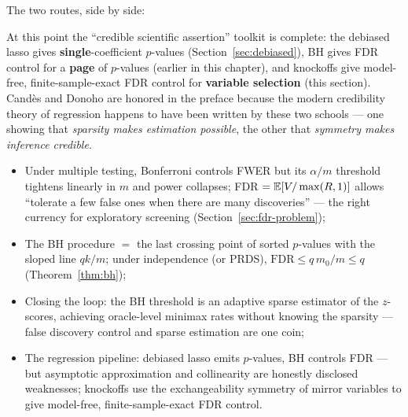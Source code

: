 The two routes, side by side:
\begin{center}
\end{center}

At this point the ``credible scientific assertion'' toolkit is complete: the debiased lasso gives \textbf{single}-coefficient $p$-values (Section~\ref{sec:debiased}), BH gives FDR control for a \textbf{page} of $p$-values (earlier in this chapter), and knockoffs give model-free, finite-sample-exact FDR control for \textbf{variable selection} (this section). Candès and Donoho are honored in the preface because the modern credibility theory of regression happens to have been written by these two schools — one showing that \emph{sparsity makes estimation possible}, the other that \emph{symmetry makes inference credible}.

\begin{keybox}
\begin{itemize}
  \item Under multiple testing, Bonferroni controls FWER but its $\alpha/m$ threshold tightens linearly in $m$ and power collapses; FDR $= \mathbb{E}[V/\max(R,1)]$ allows ``tolerate a few false ones when there are many discoveries'' — the right currency for exploratory screening (Section~\ref{sec:fdr-problem});
  \item The BH procedure $=$ the last crossing point of sorted $p$-values with the sloped line $qk/m$; under independence (or PRDS), $\mathrm{FDR} \le q\, m_0/m \le q$ (Theorem~\ref{thm:bh});
  \item Closing the loop: the BH threshold is an adaptive sparse estimator of the $z$-scores, achieving oracle-level minimax rates without knowing the sparsity\cite{abramovich2006} — false discovery control and sparse estimation are one coin;
  \item The regression pipeline: debiased lasso emits $p$-values, BH controls FDR — but asymptotic approximation and collinearity are honestly disclosed weaknesses; knockoffs use the exchangeability symmetry of mirror variables to give model-free, finite-sample-exact FDR control\cite{barber2015}.
\end{itemize}
\end{keybox}

